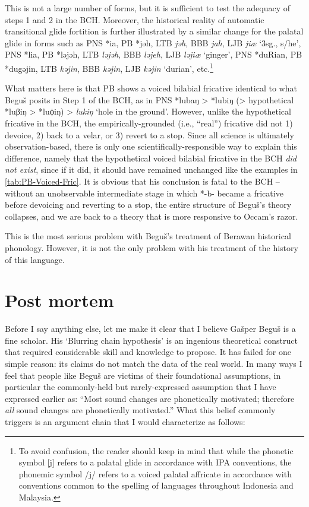 \documentclass[output=paper]{langscibook}
\begin{document}
This is not a large number of forms, but it is sufficient to test the adequacy of steps 1 and 2 in the BCH. Moreover, the historical reality of automatic transitional glide fortition is further illustrated by a similar change for the palatal glide in forms such as PNS *ia, PB *jəh, LTB \textit{jəh}, BBB \textit{jah}, LJB \textit{jiæ} ‘3sg., s/he’, PNS *lia, PB *ləjəh, LTB \textit{ləjəh}, BBB \textit{ləjeh}, LJB \textit{ləjiæ} ‘ginger’, PNS *duRian, PB *dugəjin, LTB \textit{kəjin}, BBB \textit{kəjin}, LJB \textit{kəjin} ‘durian’, etc.\footnote{To avoid confusion, the reader should keep in mind that while the phonetic symbol [j] refers to a palatal glide in accordance with IPA conventions, the phonemic symbol /j/ refers to a voiced palatal affricate in accordance with conventions common to the spelling of languages throughout Indonesia and Malaysia.}

What matters here is that PB shows a voiced bilabial fricative identical to what Beguš posits in Step 1 of the BCH, as in PNS *lubaŋ > *lubiŋ (> hypothetical *luβiŋ > *luϕiŋ) > \textit{lukiŋ} ‘hole in the ground’. However, unlike the hypothetical fricative in the BCH, the empirically-grounded (i.e., “real”) fricative did not
1) devoice, 2) back to a velar, or 3) revert to a stop. Since all science is ultimately observation-based, there is only one scientifically-responsible way to explain this difference, namely that the hypothetical voiced bilabial fricative in the BCH \textit{did not exist}, since if it did, it should have remained unchanged like the examples in \cref{tab:PB-Voiced-Fric}. It is obvious that his conclusion is fatal to the BCH -- without an unobservable intermediate stage in which *-b- became a fricative before devoicing and reverting to a stop, the entire structure of Beguš’s theory collapses, and we are back to a theory that is more responsive to Occam’s razor.

This is the most serious problem with Beguš’s treatment of Berawan historical phonology.  However, it is not the only problem with his treatment of the history of this language.

\section{Post mortem}\label{sec:Post-Mortem}
 Before I say anything else, let me make it clear that I believe Gašper Beguš is a fine scholar.  His ‘Blurring chain hypothesis’ is an ingenious theoretical construct that required considerable skill and knowledge to propose. It has failed for one simple reason: its claims do not match the data of the real world. In many ways I feel that people like Beguš are victims of their foundational assumptions, in particular the commonly-held but rarely-expressed assumption that I have expressed earlier as: “Most sound changes are phonetically motivated; therefore \textit{all} sound changes are phonetically motivated.” What this belief commonly triggers is an argument chain that I would characterize as follows:
\end{document}
